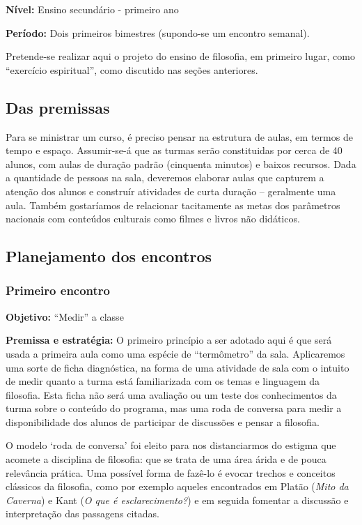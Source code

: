 \documentclass[12pt,a4paper]{article}
\begin{document}
	\textbf{Nível:} Ensino secundário - primeiro ano

	\textbf{Período:} Dois primeiros bimestres (supondo-se um encontro
	semanal). 

	Pretende-se realizar aqui o projeto do ensino de filosofia, em 
	primeiro lugar, como “exercício espiritual”, como discutido nas 
	seções anteriores. 

	\subsection{Das premissas}

	Para se ministrar um curso, é preciso pensar na 
	estrutura de aulas, em termos de tempo e espaço. Assumir-se-á que 
	as turmas serão constituidas por cerca de 40 alunos, com aulas de 
	duração padrão (cinquenta minutos) e baixos recursos. 
	Dada a quantidade de 
	pessoas na sala, deveremos elaborar aulas que capturem a atenção dos 
	alunos e construír atividades de curta duração -- geralmente uma aula.
	Também gostaríamos de relacionar tacitamente as metas dos parâmetros 
	nacionais com 	conteúdos culturais como filmes 
	e livros não didáticos. 

	\subsection{Planejamento dos encontros}

	\subsubsection{Primeiro encontro}

	\textbf{Objetivo:} “Medir” a classe

	\textbf{Premissa e estratégia:}
	O primeiro princípio a ser adotado aqui é que será usada a primeira aula 
	como uma espécie de ``termômetro'' da sala. Aplicaremos uma sorte de 
	ficha diagnóstica, na forma de uma atividade de sala com o intuito 
	de medir quanto a turma está familiarizada com os temas e linguagem 
	da filosofia. Esta ficha não será uma avaliação ou um teste dos 
	conhecimentos da turma sobre o conteúdo do programa, mas uma roda de 
	conversa para medir a disponibilidade dos alunos de participar de 
	discussões e pensar a filosofia. 
	
	O modelo `roda de conversa' foi eleito 
	para nos distanciarmos do estigma que acomete a disciplina de filosofia:
	que se trata de uma área árida e de pouca relevância prática.
	Uma possível forma de fazê-lo é evocar trechos e conceitos 
	clássicos da filosofia, como por exemplo aqueles encontrados em 
	Platão (\textit{Mito da Caverna}) e Kant (\textit{O que é 
	esclarecimento?}) e em seguida fomentar a discussão e interpretação das 
	passagens citadas.
\end{document}
